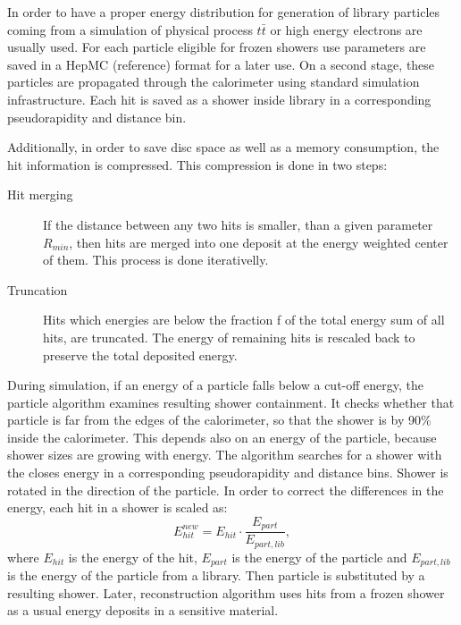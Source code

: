 In order to have a proper energy distribution for generation of library particles coming from a simulation of physical process $t\bar{t}$ or high energy electrons are usually used. For each particle eligible for frozen showers use parameters are saved in a HepMC (reference) format for a later use. On a second stage, these particles are propagated through the calorimeter using standard \atlas simulation infrastructure. Each hit is saved as a shower inside library in a corresponding pseudorapidity and distance bin. 

Additionally, in order to save disc space as well as a memory consumption, the hit information is compressed. This compression is done in two steps: 
\begin{description}
\item [Hit merging] If the distance between any two hits is smaller, than a given parameter $R_{min}$, then hits are merged into one deposit at the energy weighted center of them. This process is done iterativelly.
\item [Truncation] Hits which energies are below the fraction f of the total energy sum of all hits, are truncated. The energy of remaining hits is rescaled back to preserve the total deposited energy.
\end{description}

During simulation, if an energy of a particle falls below a cut-off energy, the particle algorithm examines resulting shower containment. It checks whether  that particle is far from the edges of the calorimeter, so that the  shower is by 90\% inside the calorimeter. This depends also on an energy of the particle, because shower sizes are growing with energy. The algorithm searches for a shower with the closes energy in a corresponding pseudorapidity and distance bins. Shower is rotated in the direction of the particle. In order to correct the differences in the energy, each hit in a shower is scaled as:
\begin{equation}
E_{hit}^{new}=E_{hit}\cdot \frac{E_{part}}{E_{part,lib}},
\end{equation}
where $E_{hit}$ is the energy of the hit, $E_{part}$ is the energy of the particle and $E_{part,lib}$ is the energy of the particle from a library. Then particle is substituted by a resulting shower. Later, reconstruction algorithm uses hits from a frozen shower as a usual energy deposits in a sensitive material. 

\begin{figure}[!tbp]
\end{figure}

